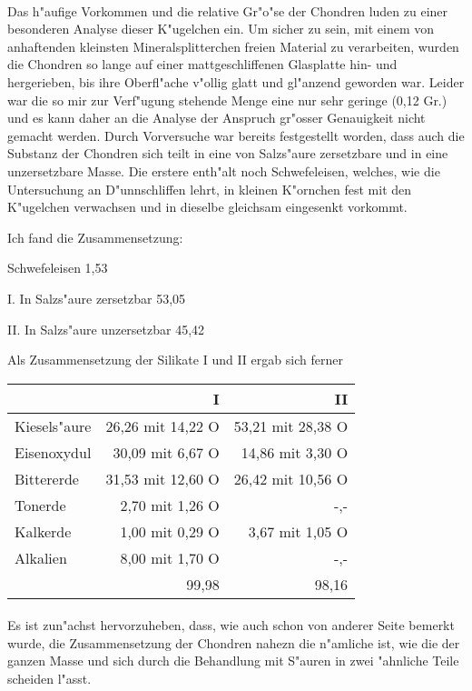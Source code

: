 \documentclass[a4paper, 11pt, oneside]{article}
\begin{document}
\paragraph{}
Das h"aufige Vorkommen und die relative Gr"o"se der Chondren luden zu einer besonderen Analyse dieser K"ugelchen ein. Um sicher zu sein, mit einem von anhaftenden kleinsten Mineralsplitterchen freien Material zu verarbeiten, wurden die Chondren so lange auf einer mattgeschliffenen Glasplatte hin- und hergerieben, bis ihre Oberfl"ache v"ollig glatt und gl"anzend geworden war. Leider war die so mir zur Verf"ugung stehende Menge eine nur sehr geringe (0,12 Gr.) und es kann daher an die Analyse der Anspruch gr"osser Genauigkeit nicht gemacht werden. Durch Vorversuche war bereits festgestellt worden, dass auch die Substanz der Chondren sich teilt in eine von Salzs"aure zersetzbare und in eine unzersetzbare Masse. Die erstere enth"alt noch Schwefeleisen, welches, wie die Untersuchung an D"unnschliffen lehrt, in kleinen K"ornchen fest mit den K"ugelchen verwachsen und in dieselbe gleichsam eingesenkt vorkommt.

Ich fand die Zusammensetzung:

Schwefeleisen 1,53

I. In Salzs"aure zersetzbar 53,05

II. In Salzs"aure unzersetzbar 45,42

Als Zusammensetzung der Silikate I und II ergab sich ferner
\begin{center}
\begin{tabular}{ |l|r|r| }
    \hline
    & I & II\\
    \hline\hline
    Kiesels"aure & 26,26 mit 14,22 O & 53,21 mit 28,38 O\\\hline
    Eisenoxydul & 30,09 mit 6,67 O & 14,86 mit 3,30 O\\\hline
    Bittererde & 31,53 mit 12,60 O & 26,42 mit 10,56 O\\\hline
    Tonerde & 2,70 mit 1,26 O & -,-\\\hline
    Kalkerde & 1,00 mit 0,29 O & 3,67 mit 1,05 O\\\hline
    Alkalien & 8,00 mit 1,70 O & -,-\\\hline
    & 99,98 & 98,16\\
    \hline
\end{tabular}
\end{center}
\paragraph{}
Es ist zun"achst hervorzuheben, dass, wie auch schon von anderer Seite bemerkt wurde, die Zusammensetzung der Chondren nahezn die n"amliche ist, wie die der ganzen Masse und sich durch die Behandlung mit S"auren in zwei "ahnliche Teile scheiden l"asst.
\end{document}
